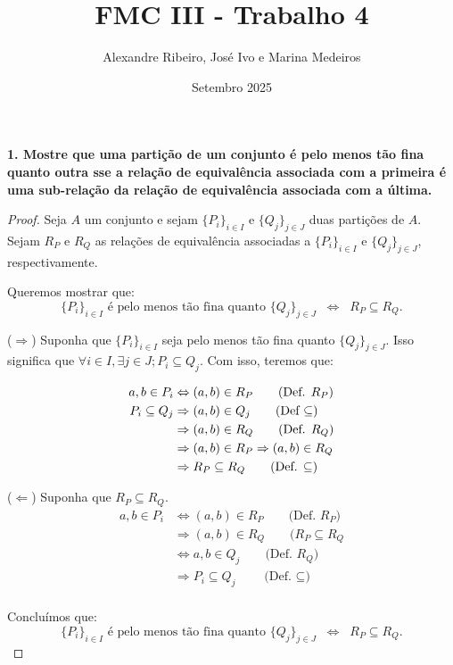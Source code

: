 \documentclass[12pt]{article}
\title{FMC III - Trabalho 4}
\author{Alexandre Ribeiro, José Ivo e Marina Medeiros}
\date{Setembro 2025}
\begin{document}
\maketitle

\textbf{1. Mostre que uma partição de um conjunto é pelo menos tão fina quanto outra sse a relação de equivalência associada com a primeira é uma sub-relação da relação de equivalência associada com a última.}

\begin{proof}
    Seja $A$ um conjunto e sejam $\{P_i\}_{i \in I}$ e $\{Q_j\}_{j \in J}$ duas partições de $A$.  
    Sejam $R_P$ e $R_Q$ as relações de equivalência associadas a $\{P_i\}_{i \in I}$ e $\{Q_j\}_{j \in J}$, respectivamente.

    Queremos mostrar que:
    \[
        \{P_i\}_{i \in I} \text{ é pelo menos tão fina quanto } \{Q_j\}_{j \in J}
        \;\;\Longleftrightarrow\;\;
        R_P \subseteq R_Q.
    \]

    ($\Rightarrow$) Suponha que $\{P_i\}_{i \in I}$ seja pelo menos tão fina quanto $\{Q_j\}_{j \in J}$. Isso significa que $\forall i \in I, \exists j \in J; P_i \subseteq Q_j$. Com isso, teremos que:
    
    \begin{align*}
        a, b \in P_i
        &\Leftrightarrow (a, b) \in R_P \tag{\text{Def. $R_P$}} \\
        P_i \subseteq Q_j
        &\Rightarrow (a, b) \in Q_j \tag{\text{Def $\subseteq$}} \\
        &\Rightarrow (a, b) \in R_Q \tag{\text{Def. $R_Q$}}\\
        &\Rightarrow (a, b) \in R_P \Rightarrow (a, b) \in R_Q  \\
        &\Rightarrow R_P \subseteq R_Q \tag{\text{Def. $\subseteq$}}\\
    \end{align*}

    \newpage

    ($\Leftarrow$) Suponha que $R_P \subseteq R_Q$.  
    \begin{align*}
        a, b \in P_i
        &\Leftrightarrow (a,b) \in R_P  \qquad \text{(Def. $R_P$)} \\
        &\Rightarrow (a, b) \in R_Q\qquad \text{($R_P \subseteq R_Q$} \\
        &\Leftrightarrow a, b \in Q_j \qquad \text{(Def. $R_Q$)} \\
        &\Rightarrow P_i\subseteq Q_j \qquad \text{(Def. $\subseteq$)} \\
    \end{align*}


    \medskip
    Concluímos que:
    \[
        \{P_i\}_{i \in I} \text{ é pelo menos tão fina quanto } \{Q_j\}_{j \in J}
        \;\;\Longleftrightarrow\;\;
        R_P \subseteq R_Q.
    \]
\end{proof}
\end{document}
